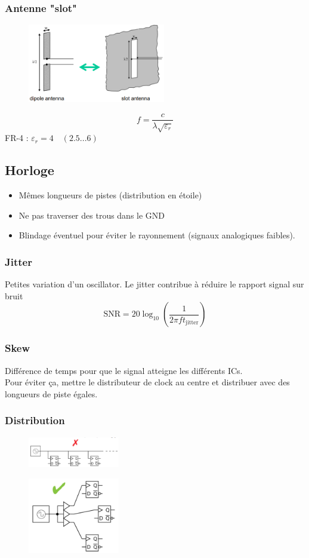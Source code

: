 \documentclass[resume]{subfiles}
\begin{document}
\begin{multicols}{3}
\subsubsection{Antenne "slot"}
\begin{figure}[H]
\centering
\includegraphics[width=6.00cm]{img_6.png}
\end{figure}
$$f=\frac{c}{\lambda\sqrt{\varepsilon_r}}$$
FR-4 : $\varepsilon_r=4\quad (2.5...6)$
\subsection{Horloge}
\begin{itemize}
\item Mêmes longueurs de pistes (distribution en étoile)
\item Ne pas traverser des trous dans le GND
\item Blindage éventuel pour éviter le rayonnement (signaux analogiques faibles).
\end{itemize}
\subsubsection{Jitter}
Petites variation d'un oscillator. Le jitter contribue à réduire le rapport signal sur bruit
$$\text{SNR}=20\log_{10}\left(\frac{1}{2\pi ft_\text{jitter}}\right)$$
\subsubsection{Skew}
Différence de temps pour que le signal atteigne les différents ICs.\\
Pour éviter ça, mettre le distributeur de clock au centre et distribuer avec des longueurs de piste égales.
\subsubsection{Distribution}
\begin{figure}[H]
\centering
\includegraphics[width=4.00cm]{img_26.png}
\end{figure}
\begin{figure}[H]
\centering
\includegraphics[width=4.00cm]{img_27.png}
\end{figure}


\end{multicols}
\end{document}
